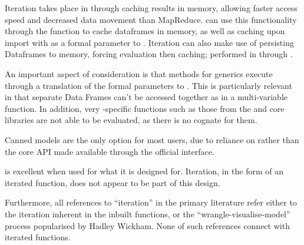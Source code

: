 Iteration takes place in  through caching results in memory, allowing faster access speed and decreased data movement than MapReduce\cite{zaharia2010spark}.
 can use this functionality through the  function to cache  dataframes in memory, as well as caching upon import with  as a formal parameter to .
Iteration can also make use of persisting  Dataframes to memory, forcing evaluation then caching; performed in  through .

An important aspect of consideration is that  methods for  generics execute through a translation of the formal parameters to .
This is particularly relevant in that separate  Data Frames can't be accessed together as in a multi-variable function.
In addition, very \R{}-specific functions such as those from the  and  core libraries are not able to be evaluated, as there is no  cognate for them.

Canned models are the only option for most users, due to  reliance on  rather than the  core API made available through the official  interface.

 is excellent when used for what it is designed for.
Iteration, in the form of an iterated function, does not appear to be part of this design.

Furthermore, all references to ``iteration'' in the primary  literature refer either to the iteration inherent in the inbuilt  functions, or the ``wrangle-visualise-model'' process popularised by Hadley Wickham\cites{luraschi2019mastering,wickham2016r}.
None of such references connect with iterated functions.

